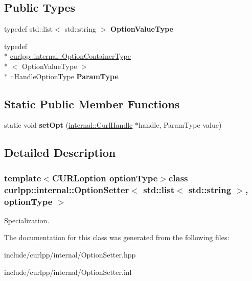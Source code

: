 \subsection*{Public Types}
\begin{DoxyCompactItemize}
\item 
\hypertarget{classcurlpp_1_1internal_1_1OptionSetter_3_01std_1_1list_3_01std_1_1string_01_4_00_01optionType_01_4_a077421ee8dcad6b3712ed7440b9fcf98}{typedef std\-::list$<$ std\-::string $>$ {\bfseries Option\-Value\-Type}}\label{classcurlpp_1_1internal_1_1OptionSetter_3_01std_1_1list_3_01std_1_1string_01_4_00_01optionType_01_4_a077421ee8dcad6b3712ed7440b9fcf98}

\item 
\hypertarget{classcurlpp_1_1internal_1_1OptionSetter_3_01std_1_1list_3_01std_1_1string_01_4_00_01optionType_01_4_aae28a3379097a0051e10c17938042ca8}{typedef \\*
\hyperlink{structcurlpp_1_1internal_1_1OptionContainerType}{curlpp\-::internal\-::\-Option\-Container\-Type}\\*
$<$ Option\-Value\-Type $>$\\*
\-::Handle\-Option\-Type {\bfseries Param\-Type}}\label{classcurlpp_1_1internal_1_1OptionSetter_3_01std_1_1list_3_01std_1_1string_01_4_00_01optionType_01_4_aae28a3379097a0051e10c17938042ca8}

\end{DoxyCompactItemize}
\subsection*{Static Public Member Functions}
\begin{DoxyCompactItemize}
\item 
\hypertarget{classcurlpp_1_1internal_1_1OptionSetter_3_01std_1_1list_3_01std_1_1string_01_4_00_01optionType_01_4_a3b075640a42bdaf71e79879daa6a891c}{static void {\bfseries set\-Opt} (\hyperlink{classcurlpp_1_1internal_1_1CurlHandle}{internal\-::\-Curl\-Handle} $\ast$handle, Param\-Type value)}\label{classcurlpp_1_1internal_1_1OptionSetter_3_01std_1_1list_3_01std_1_1string_01_4_00_01optionType_01_4_a3b075640a42bdaf71e79879daa6a891c}

\end{DoxyCompactItemize}


\subsection{Detailed Description}
\subsubsection*{template$<$C\-U\-R\-Loption option\-Type$>$class curlpp\-::internal\-::\-Option\-Setter$<$ std\-::list$<$ std\-::string $>$, option\-Type $>$}

Specialization. 

The documentation for this class was generated from the following files\-:\begin{DoxyCompactItemize}
\item 
include/curlpp/internal/Option\-Setter.\-hpp\item 
include/curlpp/internal/Option\-Setter.\-inl\end{DoxyCompactItemize}
